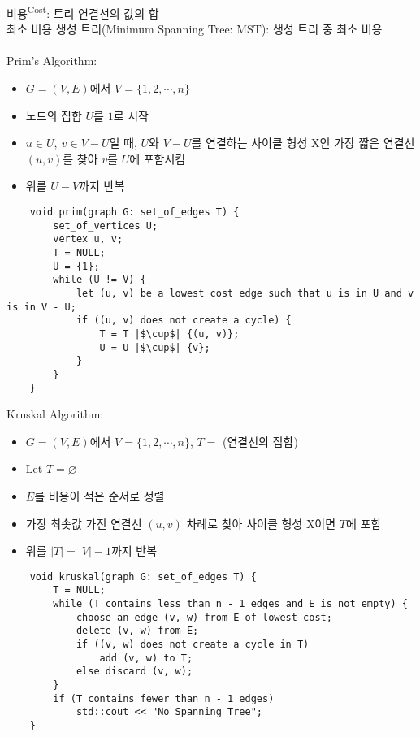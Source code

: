 비용\textsuperscript{Cost}: 트리 연결선의 값의 합\\
최소 비용 생성 트리(Minimum Spanning Tree: MST): 생성 트리 중 최소 비용
\\\\
Prim's Algorithm:
\begin{itemize}
    \item $G = (V, E)$에서 $V = \{1, 2, \cdots, n\}$
    \item 노드의 집합 $U$를 $1$로 시작
    \item $u \in U,\ v \in V - U$일 때, $U$와 $V-U$를 연결하는 사이클 형성 X인 가장 짧은 연결선 $(u, v)$를 찾아 $v$를 $U$에 포함시킴
    \item 위를 $U-V$까지 반복
\end{itemize}
\begin{verbatim}
    void prim(graph G: set_of_edges T) {
        set_of_vertices U;
        vertex u, v;
        T = NULL;
        U = {1};
        while (U != V) {
            let (u, v) be a lowest cost edge such that u is in U and v is in V - U;
            if ((u, v) does not create a cycle) {
                T = T |$\cup$| {(u, v)};
                U = U |$\cup$| {v};
            }
        }
    }
\end{verbatim}
\phantom{}
\newpage
Kruskal Algorithm:
\begin{itemize}
    \item $G = (V, E)$에서 $V = \{1, 2, \cdots, n\}$, $T =$ (연결선의 집합)
    \item Let $T = \varnothing$
    \item $E$를 비용이 적은 순서로 정렬
    \item 가장 최솟값 가진 연결선 $(u, v)$ 차례로 찾아 사이클 형성 X이면 $T$에 포함
    \item 위를 $|T| = |V| - 1$까지 반복
\end{itemize}
\begin{verbatim}
    void kruskal(graph G: set_of_edges T) {
        T = NULL;
        while (T contains less than n - 1 edges and E is not empty) {
            choose an edge (v, w) from E of lowest cost;
            delete (v, w) from E;
            if ((v, w) does not create a cycle in T)
                add (v, w) to T;
            else discard (v, w);
        }
        if (T contains fewer than n - 1 edges)
            std::cout << "No Spanning Tree";
    }
\end{verbatim}

